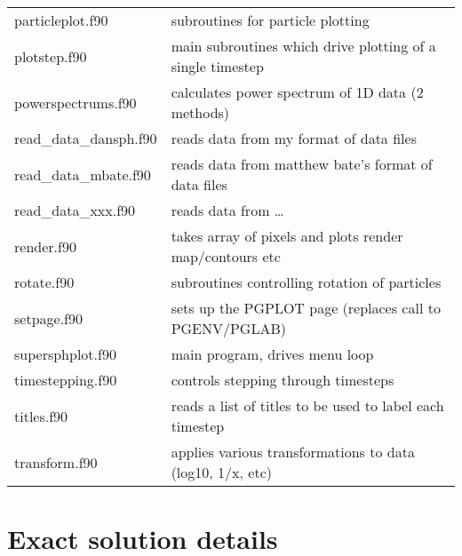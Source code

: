 \documentclass[a4paper,11pt]{article}
\begin{document}
\begin{longtable}{|lp{}|}
     particleplot.f90       & subroutines for particle plotting\\
     plotstep.f90           & main subroutines which drive plotting of a single timestep\\
     powerspectrums.f90     & calculates power spectrum of 1D data (2 methods)\\
     read\_data\_dansph.f90   & reads data from my format of data files\\
     read\_data\_mbate.f90    & reads data from matthew bate's format of data files\\
     read\_data\_xxx.f90 & reads data from \ldots \\ 
     render.f90	 	 & takes array of pixels and plots render map/contours etc\\
     rotate.f90             & subroutines controlling rotation of particles\\
     setpage.f90            & sets up the PGPLOT page (replaces call to PGENV/PGLAB)\\
     supersphplot.f90	 & main program, drives menu loop\\
     timestepping.f90       & controls stepping through timesteps\\
     titles.f90        & reads a list of titles to be used to label each timestep\\
     transform.f90	 	 & applies various transformations to data (log10, 1/x, etc) \\
\end{longtable}

\section{Exact solution details}
\label{sec:exact}
\end{document}
